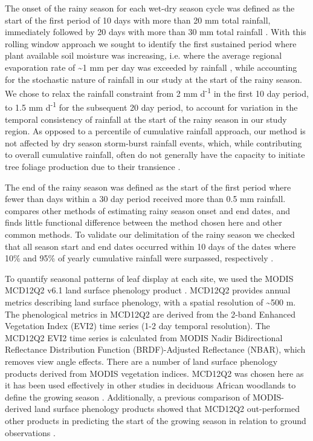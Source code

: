 \documentclass[11pt,a4paper]{article}
\begin{document}
The onset of the rainy season for each wet-dry season cycle was defined as the
start of the first period of 10 days with more than 20 mm total rainfall,
immediately followed by 20 days with more than 30 mm total rainfall
\citep{Tadross2005}. With this rolling window approach we sought to identify
the first sustained period where plant available soil moisture was increasing,
i.e. where the average regional evaporation rate of \textasciitilde{}1 mm per
day was exceeded by rainfall \citep{Campbell1996}, while accounting for the
stochastic nature of rainfall in our study at the start of the rainy season. We
chose to relax the rainfall constraint from 2 mm d\textsuperscript{-1} in the
first 10 day period, to 1.5 mm d\textsuperscript{-1} for the subsequent 20 day
period, to account for variation in the temporal consistency of rainfall at the
start of the rainy season in our study region. As opposed to a percentile of
cumulative rainfall approach, our method is not affected by dry season
storm-burst rainfall events, which, while contributing to overall cumulative
rainfall, often do not generally have the capacity to initiate tree foliage
production due to their transience \citep{February2016}. 

The end of the rainy season was defined as the start of the first period where
fewer than  days within a 30 day period received more than
0.5 mm rainfall. \citet{Guan2014} compares other methods of estimating rainy
season onset and end dates, and finds little functional difference between the
method chosen here and other common methods. To validate our delimitation of
the rainy season we checked that all season start and end dates occurred within
10 days of the dates where 10\% and 95\% of yearly cumulative rainfall were
surpassed, respectively \citep{Adole2018b}. 

To quantify seasonal patterns of leaf display at each site, we used the MODIS
MCD12Q2 v6.1 land surface phenology product \citep{MCD12Q2}. MCD12Q2 provides
annual metrics describing land surface phenology, with a spatial resolution of
\textasciitilde{}500 m. The phenological metrics in MCD12Q2 are derived from
the 2-band Enhanced Vegetation Index (EVI2) time series (1-2 day
temporal resolution). The MCD12Q2 EVI2 time series is calculated from MODIS
Nadir Bidirectional Reflectance Distribution Function (BRDF)-Adjusted
Reflectance (NBAR), which removes view angle effects. There are a number of
land surface phenology products derived from MODIS vegetation indices. MCD12Q2
was chosen here as it has been used effectively in other studies in deciduous
African woodlands to define the growing season \citep{Begue2014, Adole2018a}.
Additionally, a previous comparison of MODIS-derived land surface phenology
products showed that MCD12Q2 out-performed other products in predicting the
start of the growing season in relation to ground observations
\citep{Peng2017}. 
\end{document}
